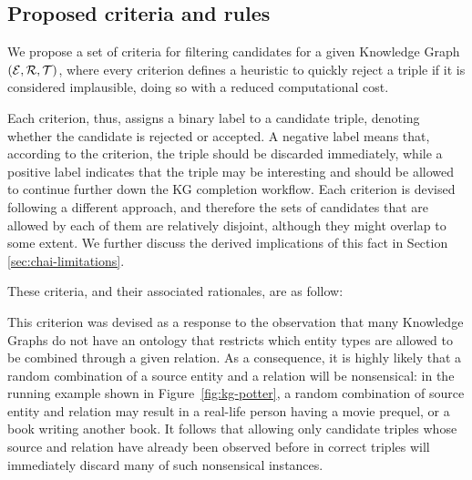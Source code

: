 \subsection{Proposed criteria and rules}
We propose a set of criteria for filtering candidates for a given Knowledge Graph $(\mathcal{E}{}, \mathcal{R}{}, \mathcal{T}{})$, where every criterion defines a heuristic to quickly reject a triple if it is considered implausible, doing so with a reduced computational cost. 

Each criterion, thus, assigns a binary label to a candidate triple, denoting whether the candidate is rejected or accepted. A negative label means that, according to the criterion, the triple should be discarded immediately, while a positive label indicates that the triple may be interesting and should be allowed to continue further down the KG completion workflow. Each criterion is devised following a different approach, and therefore the sets of candidates that are allowed by each of them are relatively disjoint, although they might overlap to some extent. 
We further discuss the derived implications of this fact in Section \ref{sec:chai-limitations}. 

These criteria, and their associated rationales, are as follow:


This criterion was devised as a response to the observation that many Knowledge Graphs do not have an ontology that restricts which entity types are allowed to be combined through a given relation. As a consequence, it is highly likely that a random combination of a source entity and a relation will be nonsensical: in the running example shown in Figure~\ref{fig:kg-potter}, a random combination of source entity and relation may result in a real-life person having a movie prequel, or a book writing another book. It follows that allowing only candidate triples whose source and relation have already been observed before in correct triples will immediately discard many of such nonsensical instances.


